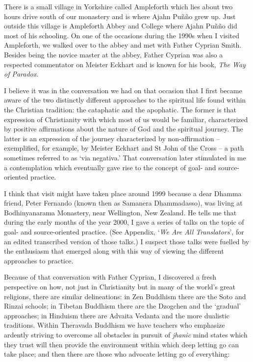 There is a small village in Yorkshire called Ampleforth which lies about
two hours drive south of our monastery and is where Ajahn Puñño grew up.
Just outside this village is Ampleforth Abbey and College\cite{ampleforth}
where Ajahn Puñño did most of his
schooling. On one of the occasions during the 1990s when I visited
Ampleforth, we walked over to the abbey and met with Father Cyprian
Smith. Besides being the novice master at the abbey, Father Cyprian was
also a respected commentator on Meister Eckhart and is known for his
book, \emph{The Way of Paradox}\cite{paradox}.

I believe it was in the conversation we had on that occasion that I
first became aware of the two distinctly different approaches to the
spiritual life found within the Christian tradition: the
cataphatic and the apophatic\cite{cataphatic}. The former is that expression of
Christianity with which most of us would be familiar, characterized by
positive affirmations about the nature of God and the spiritual journey.
The latter is an expression of the journey characterized by
non-affirmation -- exemplified, for example, by Meister Eckhart and St
John of the Cross -- a path sometimes referred to as `via negativa.'
That conversation later stimulated in me a contemplation which
eventually gave rise to the concept of goal- and source-oriented
practice.

I think that visit might have taken place around 1999 because a dear
Dhamma friend, Peter Fernando (known then as Samanera Dhammadasso), was
living at Bodhinyanarama Monastery, near Wellington, New Zealand. He
tells me that during the early months of the year 2000, I gave a series
of talks on the topic of goal- and source-oriented practice. (See
Appendix, `\emph{We Are All Translators}', for an edited transcribed
version of those talks.) I suspect those talks were fuelled by the
enthusiasm that emerged along with this way of viewing the different
approaches to practice.

Because of that conversation with Father Cyprian, I discovered a fresh
perspective on how, not just in Christianity but in many of the
world's great religions, there are similar delineations: in Zen Buddhism
there are the Soto and Rinzai schools; in Tibetan Buddhism there are the
Dzogchen and the `gradual' approaches; in Hinduism there are Advaita
Vedanta and the more dualistic traditions. Within Theravada Buddhism we
have teachers who emphasize ardently striving to overcome all obstacles
in pursuit of \emph{jhanic} mind states which they trust will then
provide the environment within which deep letting go can take place; and
then there are those who advocate letting go of everything:

